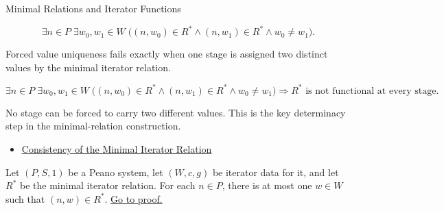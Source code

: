 \begin{topicbox}{Minimal Relations and Iterator Functions}

\begin{remark*}
\[
\exists n\in P\;\exists w_0,w_1\in W\;
\bigl((n,w_0)\in R^*\land (n,w_1)\in R^*\land w_0\neq w_1\bigr).
\]
\end{remark*}

\begin{remark*}
Forced value uniqueness fails exactly when one stage is assigned two distinct
values by the minimal iterator relation.
\end{remark*}

\begin{remark*}
\[
\exists n\in P\;\exists w_0,w_1\in W\;
\bigl((n,w_0)\in R^*\land (n,w_1)\in R^*\land w_0\neq w_1\bigr)
\Longrightarrow
R^* \text{ is not functional at every stage}.
\]
\end{remark*}

\begin{remark*}[Interpretation]
No stage can be forced to carry two different values. This is the key
determinacy step in the minimal-relation construction.
\end{remark*}

\begin{remark*}[Dependencies]
\begin{itemize}
  \item \hyperref[lem:iterator-relation-consistency]{Consistency of the Minimal Iterator Relation}
\end{itemize}
\end{remark*}

\begin{tcolorbox}[colback=lembox, colframe=lemborder, arc=2pt,
  left=6pt, right=6pt, top=4pt, bottom=4pt,
  title={\small\textbf{Lemma (Determinism of the Minimal Iterator Relation)}},
  fonttitle=\small\bfseries]
\begin{lemma}
\label{lem:minimal-iterator-relation-deterministic}
Let $(P,S,1)$ be a Peano system, let $(W,c,g)$ be iterator data for it, and let
$R^*$ be the minimal iterator relation. For each $n\in P$, there is at most one
$w\in W$ such that $(n,w)\in R^*$.
\hyperref[prf:minimal-iterator-relation-deterministic]{Go to proof.}
\end{lemma}
\end{tcolorbox}


\end{topicbox}
